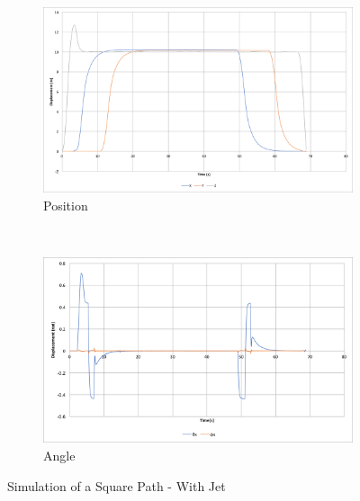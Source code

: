\documentclass[11pt]{article}
\begin{document}
\begin{figure}
    \begin{subfigure}{\textwidth}
        \includegraphics[width=\linewidth]{square_path_w_jet}
        \caption{Position}
        \label{fig:square_path_w_jet}
    \end{subfigure}\hspace*{\fill}
    \\
    \begin{subfigure}{\textwidth}
        \includegraphics[width=\linewidth]{square_path_w_jet_angle}
        \caption{Angle}
        \label{fig:square_path_w_jet_angle}
    \end{subfigure}

    \caption{Simulation of a Square Path - With Jet}
    \label{fig:Square Path Jet}
\end{figure}
\end{document}
